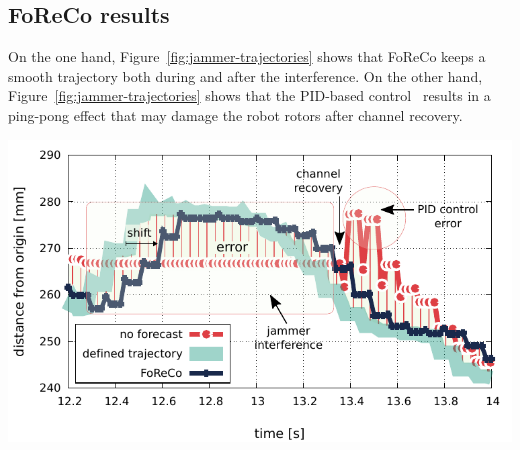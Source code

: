 \documentclass[a0,portrait]{a0poster}
\begin{document}
\begin{multicols}{2}
\section*{FoReCo results}
On the one hand,
Figure~\ref{fig:jammer-trajectories} shows 
that FoReCo keeps a smooth trajectory
both during and after the interference.
On the other hand, Figure~\ref{fig:jammer-trajectories}
shows that the PID-based control~\cite{control-survey}
results in a ping-pong effect that
may damage the robot rotors after channel
recovery.




\begin{center}\vspace{1cm}
    \includegraphics[width=.782\linewidth]{figures/foreco-experim-out-xyz-zoomed.pdf}
    \label{fig:jammer-trajectories}
\end{center}\vspace{1cm}

\end{multicols}
\end{document}
